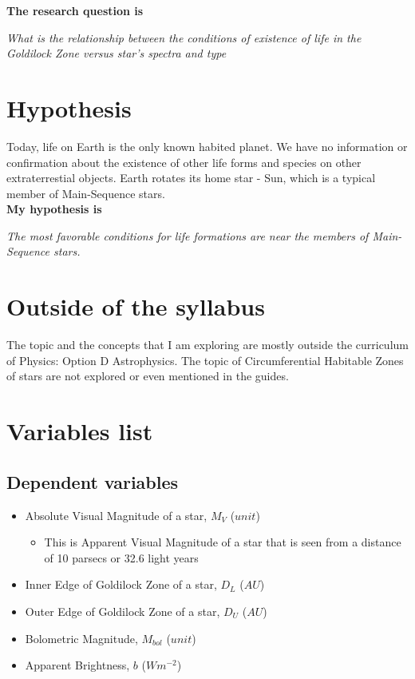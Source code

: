 \documentclass{IEEEtran}
\begin{document}
\textbf{The research question is}

\textit{What is the relationship between the conditions of existence of life in the Goldilock Zone versus star's spectra and type }

\section{Hypothesis}

Today, life on Earth is the only known habited planet. We have no information or confirmation about the existence of other life forms and species on other extraterrestial objects. Earth rotates its home star - Sun, which is a typical member of Main-Sequence stars.\\

\textbf{My hypothesis is}

  \textit{The most favorable conditions for life formations are near the members of Main-Sequence stars.}

  \section{Outside of the syllabus}

  The topic and the concepts that I am exploring are mostly outside the curriculum of Physics: Option D Astrophysics. The topic of Circumferential Habitable Zones of stars are not explored or even mentioned in the guides.
  
  \section{Variables list}
  
  \subsection{Dependent variables}
  
  \begin{itemize}

  \item Absolute Visual Magnitude of a star, $M_V$ ($unit$)
    
    \begin{itemize}
      
    \item This is Apparent Visual Magnitude of a star that is seen from a distance of 10 parsecs or 32.6 light years
      
    \end{itemize}
    
  \item Inner Edge of Goldilock Zone of a star, $D_L$ ($AU$) 
    
  \item Outer Edge of Goldilock Zone of a star, $D_U$ ($AU$)
    
  \item Bolometric Magnitude, $M_{bol}$ ($unit$)
    
  \item Apparent Brightness, $b$ ($W m^{-2}$)
    
  \end{itemize}
  
\end{document}
